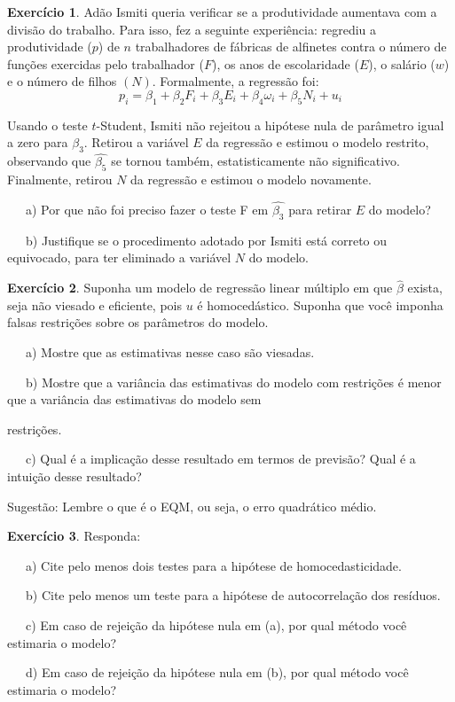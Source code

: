 \documentclass[
]{book}
\theoremstyle{definition}
\theoremstyle{definition}
\theoremstyle{definition}
\newtheorem{exercise}{Exercício}[chapter]
\theoremstyle{remark}
\begin{document}
\begin{exercise}
\protect\hypertarget{exr:exerint5}{}{\label{exr:exerint5} } Adão Ismiti queria verificar se a produtividade aumentava com a divisão do trabalho. Para isso, fez a seguinte experiência: regrediu a produtividade (\(p\)) de \(n\) trabalhadores de fábricas de alfinetes contra o número de funções exercidas pelo trabalhador (\(F\)), os anos de escolaridade (\(E\)), o salário (\(w\)) e o número de filhos \((N)\). Formalmente, a regressão
foi:
\[p_i=\beta_1+\beta_2F_i+\beta_3E_i+\beta_4\omega_i+\beta_5N_i+u_i\]

Usando o teste \(t\)-Student, Ismiti não rejeitou a hipótese nula de parâmetro igual a zero para \(\beta_3\). Retirou a variável \(E\) da
regressão e estimou o modelo restrito, observando que \(\hat{\beta_5}\) se tornou também, estatisticamente não significativo. Finalmente, retirou \(N\) da regressão e estimou o modelo novamente.

~~~a) Por que não foi preciso fazer o teste F em \(\hat{\beta_3}\) para retirar \(E\) do modelo?

~~~b) Justifique se o procedimento adotado por Ismiti está correto ou equivocado, para ter eliminado a variável \(N\) do modelo.
\end{exercise}

\begin{exercise}
\protect\hypertarget{exr:exerint6}{}{\label{exr:exerint6} }Suponha um modelo de regressão linear múltiplo em que \(\hat{\beta}\) exista, seja não viesado e eficiente, pois \(u\) é homocedástico. Suponha que você imponha falsas restrições sobre os parâmetros do modelo.

~~~a) Mostre que as estimativas nesse caso são viesadas.

~~~b) Mostre que a variância das estimativas do modelo com restrições é menor que a variância das estimativas do modelo sem

restrições.

~~~c) Qual é a implicação desse resultado em termos de previsão? Qual é a intuição desse resultado?

Sugestão: Lembre o que é o EQM, ou seja, o erro quadrático médio.
\end{exercise}

\begin{exercise}
\protect\hypertarget{exr:exerint7}{}{\label{exr:exerint7} }Responda:

~~~a) Cite pelo menos dois testes para a hipótese de homocedasticidade.

~~~b) Cite pelo menos um teste para a hipótese de autocorrelação dos resíduos.

~~~c) Em caso de rejeição da hipótese nula em (a), por qual método você estimaria o modelo?

~~~d) Em caso de rejeição da hipótese nula em (b), por qual método você estimaria o modelo?
\end{exercise}
\end{document}
